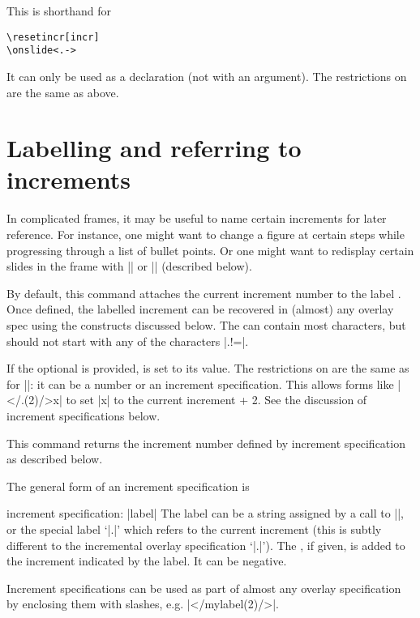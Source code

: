 \documentclass[a4paper]{ltxdoc}
\begin{document}
\begin{command}{\fromincr{}}
  This is shorthand for
\begin{verbatim}
\resetincr[incr]
\onslide<.->
\end{verbatim}
It can only be used as a declaration (not with an argument).  The restrictions
on  are the same as above.  
\end{command}


\section{Labelling and referring to increments}\label{sec:labels}

In complicated frames, it may be useful to name certain increments for later
reference.  For instance, one might want to change a figure at certain steps
while progressing through a list of bullet points.  Or one might want to
redisplay certain slides in the frame with |\afterframe| or |\handoutframe|
(described below).

\begin{command}{\incrlabel{}}
  By default, this command attaches the current increment number to the label
  .  Once defined, the labelled increment can be recovered in
  (almost) any overlay spec using the constructs discussed below.  The
   can contain most characters, but should not start with any of the
  characters |.!=|.

  If the optional  is provided,  is set to its value.
  The restrictions on  are the same as for |\resetincr|: it can be a
  number or an increment specification.  This allows forms like
  |\incrlabel</.(2)/>{x}| to set |x| to the current increment + 2.  See the
  discussion of increment specifications below.
\end{command}

\begin{command}{\incrref {}}
  This command returns the increment number defined by increment specification
   as described below.
\end{command}

\noindent
The general form of an increment specification is
\begin{command}{{increment specification}: |label|}
  The label can be a string assigned by a call to |\incrlabel|, or the special
  label `|.|' which refers to the current increment (this is subtly different to
  the incremental overlay specification `|.|').  The , if given, is
  added to the increment indicated by the label.  It can be negative.

  Increment specifications can be used as part of almost any overlay
  specification by enclosing them with slashes, e.g. |</mylabel(2)/>|.
\end{command}
\end{document}
